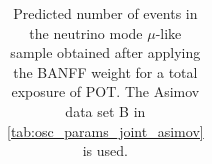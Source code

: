 \begin{table}
\begin{tabular} { | l ||r | r | r | r | r | r | | r | }
\end{tabular}
\caption{
Predicted number of events in the neutrino mode $\mu$-like sample
obtained after applying the BANFF weight
for a total exposure of \TotalPotNuRunOneSevenB{} POT.
The Asimov data set B in \cref{tab:osc_params_joint_asimov} is used.
}
\label{tab:events_1rmu_Asimov_B_Run17b}
\end{table}


